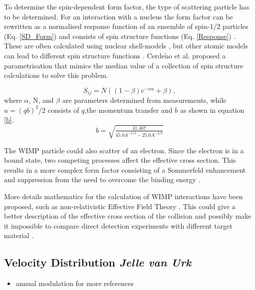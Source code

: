 \documentclass{article}
\begin{document}
To determine the spin-dependent form factor, the type of scattering particle has to be determined. For an interaction with a nucleus the form factor can be rewritten as a normalised response function of an ensemble of spin-1/2 particles (Eq. \ref{SD_Form}) and consists of spin structure functions (Eq. \ref{Response}) \cite{Cannoni:2011iu}. These are often calculated using nuclear shell-models \cite{Ressell:1997kx,Toivanen:2009zza}, but other atomic models can lead to different spin structure functions \cite{Ellis:1987sh, Engel:1989ix, Iachello:1990ut}. Cerde$\tilde{\text{n}}$o et al.\cite{Cerdeno:2012ix} proposed a parametrisation that mimics the median value of a collection of spin structure calculations to solve this problem. 

\begin{equation}
    S_{ij} = N((1-\beta)e^{-\alpha u} + \beta), 
\end{equation}
where $\alpha$, N, and $\beta$ are parameters determined from measurements, while $u = (qb)^2/2$ consists of $q$,the momentum transfer and $b$ as shown in equation \ref{b}.
 \begin{equation} \label{b}
     b = \sqrt{\tfrac{41.467}{45.0A^{-1/3}-25.0A^{-2/3}}}
 \end{equation}

The WIMP particle could also scatter of an electron. Since the electron is in a bound state, two competing processes affect the effective cross section. This results in a more complex form factor consisting of a Sommerfeld enhancement \cite{ArkaniHamed:2008qn} and suppression from the need to overcome the binding energy \cite{Essig:2011nj}.

More details mathematics for the calculation of WIMP interactions have been proposed, such as non-relativistic Effective Field Theory \cite{Fitzpatrick:2012ib}. This could give a better description of the effective cross section of the collision and possibly make it impossible to compare direct detection experiments with different target material \cite{Schneck:2015eqa}. 

\subsection{Velocity Distribution \small{\textit{Jelle van Urk}}} \label{DM_Velocity}

\begin{itemize}
    \item annual modulation \cite{Undagoitia:2015gya} for more references
\end{itemize}
\end{document}

